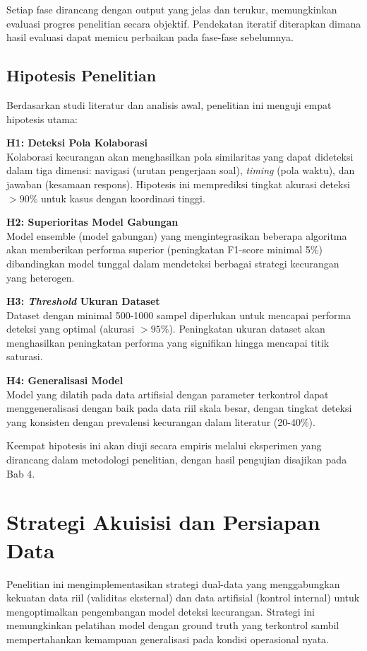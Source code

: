 Setiap fase dirancang dengan output yang jelas dan terukur, memungkinkan evaluasi progres penelitian secara objektif. Pendekatan iteratif diterapkan dimana hasil evaluasi dapat memicu perbaikan pada fase-fase sebelumnya.

\subsection{Hipotesis Penelitian}
\label{subsec:hipotesisPenelitian}
Berdasarkan studi literatur dan analisis awal, penelitian ini menguji empat hipotesis utama:

\textbf{H1: Deteksi Pola Kolaborasi}\\
Kolaborasi kecurangan akan menghasilkan pola similaritas yang dapat dideteksi dalam tiga dimensi: navigasi (urutan pengerjaan soal), \textit{timing} (pola waktu), dan jawaban (kesamaan respons). Hipotesis ini memprediksi tingkat akurasi deteksi $>90\%$ untuk kasus dengan koordinasi tinggi.

\textbf{H2: Superioritas Model Gabungan}\\
Model ensemble (model gabungan) yang mengintegrasikan beberapa algoritma akan memberikan performa superior (peningkatan F1-score minimal 5\%) dibandingkan model tunggal dalam mendeteksi berbagai strategi kecurangan yang heterogen.

\textbf{H3: \textit{Threshold} Ukuran Dataset}\\
Dataset dengan minimal 500-1000 sampel diperlukan untuk mencapai performa deteksi yang optimal (akurasi $>95\%$). Peningkatan ukuran dataset akan menghasilkan peningkatan performa yang signifikan hingga mencapai titik saturasi.

\textbf{H4: Generalisasi Model}\\
Model yang dilatih pada data artifisial dengan parameter terkontrol dapat menggeneralisasi dengan baik pada data riil skala besar, dengan tingkat deteksi yang konsisten dengan prevalensi kecurangan dalam literatur (20-40\%).

Keempat hipotesis ini akan diuji secara empiris melalui eksperimen yang dirancang dalam metodologi penelitian, dengan hasil pengujian disajikan pada Bab 4.

\section{Strategi Akuisisi dan Persiapan Data}
\label{sec:strategiAkuisisiData}
Penelitian ini mengimplementasikan strategi dual-data yang menggabungkan kekuatan data riil (validitas eksternal) dan data artifisial (kontrol internal) untuk mengoptimalkan pengembangan model deteksi kecurangan. Strategi ini memungkinkan pelatihan model dengan ground truth yang terkontrol sambil mempertahankan kemampuan generalisasi pada kondisi operasional nyata.


